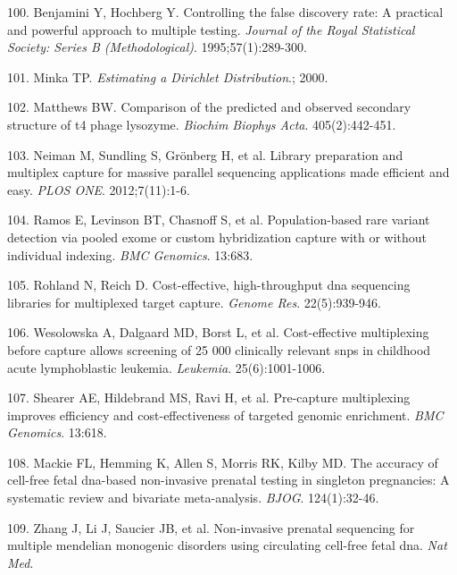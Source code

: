\documentclass[11pt,letterpaper]{book}
\begin{document}
\leavevmode\hypertarget{ref-benjamini:1995aa}{}%
100. Benjamini Y, Hochberg Y. Controlling the false discovery rate: A practical and powerful approach to multiple testing. \emph{Journal of the Royal Statistical Society: Series B (Methodological)}. 1995;57(1):289-300.

\leavevmode\hypertarget{ref-minka:2000aa}{}%
101. Minka TP. \emph{Estimating a Dirichlet Distribution}.; 2000.

\leavevmode\hypertarget{ref-matthews:1975aa}{}%
102. Matthews BW. Comparison of the predicted and observed secondary structure of t4 phage lysozyme. \emph{Biochim Biophys Acta}. 405(2):442-451.

\leavevmode\hypertarget{ref-neiman:2012aa}{}%
103. Neiman M, Sundling S, Grönberg H, et al. Library preparation and multiplex capture for massive parallel sequencing applications made efficient and easy. \emph{PLOS ONE}. 2012;7(11):1-6.

\leavevmode\hypertarget{ref-ramos:2012aa}{}%
104. Ramos E, Levinson BT, Chasnoff S, et al. Population-based rare variant detection via pooled exome or custom hybridization capture with or without individual indexing. \emph{BMC Genomics}. 13:683.

\leavevmode\hypertarget{ref-rohland:2012aa}{}%
105. Rohland N, Reich D. Cost-effective, high-throughput dna sequencing libraries for multiplexed target capture. \emph{Genome Res}. 22(5):939-946.

\leavevmode\hypertarget{ref-wesolowska:2011aa}{}%
106. Wesolowska A, Dalgaard MD, Borst L, et al. Cost-effective multiplexing before capture allows screening of 25 000 clinically relevant snps in childhood acute lymphoblastic leukemia. \emph{Leukemia}. 25(6):1001-1006.

\leavevmode\hypertarget{ref-shearer:2012aa}{}%
107. Shearer AE, Hildebrand MS, Ravi H, et al. Pre-capture multiplexing improves efficiency and cost-effectiveness of targeted genomic enrichment. \emph{BMC Genomics}. 13:618.

\leavevmode\hypertarget{ref-mackie:2017aa}{}%
108. Mackie FL, Hemming K, Allen S, Morris RK, Kilby MD. The accuracy of cell-free fetal dna-based non-invasive prenatal testing in singleton pregnancies: A systematic review and bivariate meta-analysis. \emph{BJOG}. 124(1):32-46.

\leavevmode\hypertarget{ref-zhang:2019aa}{}%
109. Zhang J, Li J, Saucier JB, et al. Non-invasive prenatal sequencing for multiple mendelian monogenic disorders using circulating cell-free fetal dna. \emph{Nat Med}.
\end{document}
